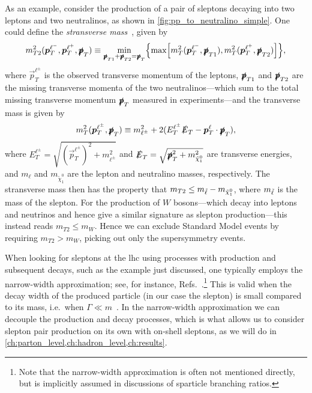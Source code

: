 As an example, consider the production of a pair of sleptons decaying into two leptons and two neutralinos, as shown in \cref{fig:pp_to_neutralino_simple}.
One could define the \emph{stransverse mass}~\cite{Lester:1999tx,Barr:2003rg}, given by
\begin{equation}
    m_{T2}^2(\vec{p}_T^{\ell^-}, \vec{p}_T^{\ell^+}, \vec{\slashed{p}}_T)
    \equiv \min_{\vec{\slashed{p}}_{T1} + \vec{\slashed{p}}_{T2} = \vec{\slashed{p}}_T} \Bigl\{
        \max\Bigl[
            m_T^2(\vec{p}_T^{\ell^-}, \vec{\slashed{p}}_{T1}), m_T^2(\vec{p}_T^{\ell^+}, \vec{\slashed{p}}_{T2})
        \Bigr]
    \Bigr\},
\end{equation}
where $\vec{p}_T^{\ell^\pm}$ is the observed transverse momentum of the leptons, $\vec{\slashed{p}}_{T1}$ and $\vec{\slashed{p}}_{T2}$ are the missing transverse momenta of the two neutralinos---which sum to the total missing transverse momentum $\vec{\slashed{p}}_T$ measured in experiments---and the transverse mass is given by
\begin{equation}
    m_T^2(\vec{p}_T^{\ell^\pm}, \vec{\slashed{p}}_T) \equiv m_{\ell^\pm}^2 + 2(E_T^{\ell^\pm} \slashed{E}_T - \vec{p}_T^{\ell}\cdot\vec{\slashed{p}}_T),
\end{equation}
where $E_T^{\ell^\pm} = \sqrt{(\vec{p}_T^{\ell^\pm})^2+m_{\ell^\pm}^2}$ and $\slashed{E}_T = \sqrt{\vec{\slashed{p}}_T^2 + m_{\tilde\chi_1^0}^2}$ are transverse energies, and $m_{\ell}$ and $m_{\tilde\chi_1^0}$ are the lepton and neutralino masses, respectively.
The stransverse mass then has the property that $m_{T2} \leq m_{\slepton} - m_{\tilde\chi_1^0}$, where $m_{\slepton}$ is the mass of the slepton.
For the production of $W$ bosons---which decay into leptons and neutrinos and hence give a similar signature as slepton production---this instead reads $m_{T2} \leq m_W$.
Hence we can exclude Standard Model events by requiring $m_{T2} > m_W$, picking out only the supersymmetry events.

When looking for sleptons at the \gls{lhc} using processes with production and subsequent decays, such as the example just discussed, one typically employs the narrow-width approximation; see, for instance, Refs.~\cite{ATLAS:2025evx,ATLAS:2022hbt,CMS:2019eln}.\footnote{Note that the narrow-width approximation is often not mentioned directly, but is implicitly assumed in discussions of sparticle branching ratios.}
This is valid when the decay width of the produced particle (in our case the slepton) is small compared to its mass, i.e.\ when $\Gamma \ll m$~\cite{Schwartz:2014sze}.
In the narrow-width approximation we can decouple the production and decay processes, which is what allows us to consider slepton pair production on its own with on-shell sleptons, as we will do in \cref{ch:parton_level,ch:hadron_level,ch:results}.




